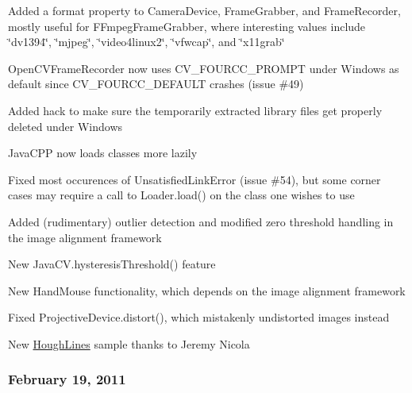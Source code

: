 \begin{DoxyItemize}
\item Added a {\ttfamily format} property to {\ttfamily Camera\+Device}, {\ttfamily Frame\+Grabber}, and {\ttfamily Frame\+Recorder}, mostly useful for {\ttfamily F\+Fmpeg\+Frame\+Grabber}, where interesting values include \char`\"{}dv1394\char`\"{}, \char`\"{}mjpeg\char`\"{}, \char`\"{}video4linux2\char`\"{}, \char`\"{}vfwcap\char`\"{}, and \char`\"{}x11grab\char`\"{}
\item {\ttfamily Open\+C\+V\+Frame\+Recorder} now uses {\ttfamily C\+V\+\_\+\+F\+O\+U\+R\+C\+C\+\_\+\+P\+R\+O\+M\+P\+T} under Windows as default since {\ttfamily C\+V\+\_\+\+F\+O\+U\+R\+C\+C\+\_\+\+D\+E\+F\+A\+U\+L\+T} crashes (issue \#49)
\item Added hack to make sure the temporarily extracted library files get properly deleted under Windows
\item Java\+C\+P\+P now loads classes more lazily
\item Fixed most occurences of {\ttfamily Unsatisfied\+Link\+Error} (issue \#54), but some corner cases may require a call to {\ttfamily Loader.\+load()} on the class one wishes to use
\item Added (rudimentary) outlier detection and modified zero threshold handling in the image alignment framework
\item New {\ttfamily Java\+C\+V.\+hysteresis\+Threshold()} feature
\item New {\ttfamily Hand\+Mouse} functionality, which depends on the image alignment framework
\item Fixed {\ttfamily Projective\+Device.\+distort()}, which mistakenly undistorted images instead
\item New {\ttfamily \hyperlink{class_hough_lines}{Hough\+Lines}} sample thanks to Jeremy Nicola
\end{DoxyItemize}

\subsubsection*{February 19, 2011}


